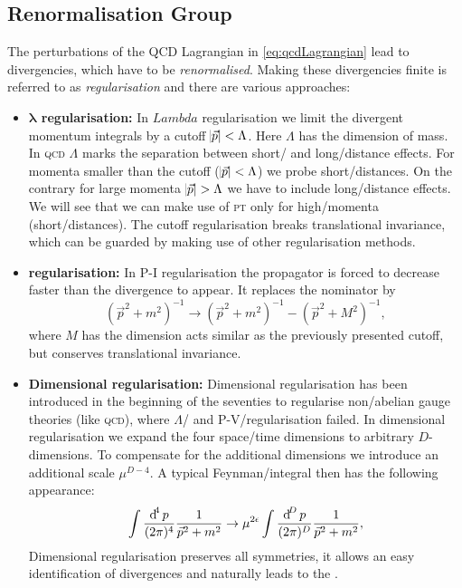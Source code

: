 \documentclass[../../index.tex]{subfiles}
\begin{document}
\subsection{Renormalisation Group}
The perturbations of the QCD Lagrangian in \cref{eq:qcdLagrangian} lead to
divergencies, which have to be \textit{renormalised}. Making these divergencies
finite is referred to as \textit{regularisation} and there are various
approaches:
\begin{itemize}
\item \textbf{$\bm{\lambda}$ regularisation:} In $Lambda$ regularisation we
  limit the divergent momentum integrals by a cutoff $\abs{\vec p} < \Lambda$.
  Here $\Lambda$ has the dimension of mass. In \textsc{qcd} $\Lambda$ marks the
  separation between short\-/ and long\-/distance effects. For momenta smaller
  than the cutoff ($\abs{\vec p} < \Lambda$) we probe short\-/distances. On the
  contrary for large momenta $\abs{\vec p} > \Lambda$ we have to include
  long\-/distance effects. We will see that we can make use of \textsc{pt} only
  for high\-/momenta (short\-/distances). The cutoff regularisation breaks
  translational invariance, which can be guarded by making use of other
  regularisation methods.
\item \textbf{ regularisation:} \cite{Pauli1949} In
  \textsc{P-I} regularisation the propagator is forced to decrease faster than
  the divergence to appear. It replaces the nominator by
  \begin{equation}
    (\vec p^2 + m^2)^{-1} \to (\vec p^2 + m^2)^{-1} - (\vec p^2 + M^2)^{-1},
  \end{equation}
  where $M$ has the dimension acts similar as the previously presented cutoff,
  but conserves translational invariance.
\item \textbf{Dimensional regularisation:}
  \cite{Bollini1972,tHooft1972,tHooft1973} Dimensional regularisation has been
  introduced in the beginning of the seventies to regularise non\-/abelian gauge
  theories (like \textsc{qcd}), where $\Lambda$\-/ and
  \textsc{P-V}\-/regularisation failed. In dimensional regularisation we expand
  the four space\-/time dimensions to arbitrary $D$-dimensions. To compensate
  for the additional dimensions we introduce an additional scale $\mu^{D-4}$. A
  typical Feynman\-/integral then has the following appearance:
  \begin{equation}
    \label{eq:dimRegFeynmanIntegral}
    \int \fdif{p} \frac{1}{\vec p^2 + m^2} \to \mu^{2\epsilon} \int \frac{\dif^D p}{(2\pi)^D}\frac{1}{\vec p^2+m^2},
  \end{equation}
  Dimensional regularisation preserves all symmetries, it allows an easy
  identification of divergences and naturally leads to the  \cite{tHooft1973,Weinberg1973a}.
\end{itemize}
\end{document}
